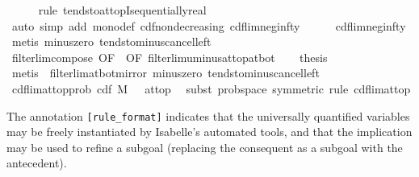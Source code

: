 \documentclass{article}
\theoremstyle{definition}
\begin{document}
\begin{isabellebody}
\ \ \ \ \isamarkupfalse%
\ {\isacharparenleft}rule\ tendsto{\isacharunderscore}at{\isacharunderscore}topI{\isacharunderscore}sequentially{\isacharunderscore}real{\isacharparenright}\isanewline
\ \ \ \ \isamarkupfalse%
\ {\isacharparenleft}auto\ simp\ add{\isacharcolon}\ mono{\isacharunderscore}def\ cdf{\isacharunderscore}nondecreasing\ cdf{\isacharunderscore}lim{\isacharunderscore}neg{\isacharunderscore}infty{\isacharparenright}\isanewline
\ \ \ \ \isamarkupfalse%
\ cdf{\isacharunderscore}lim{\isacharunderscore}neg{\isacharunderscore}infty\ \isamarkupfalse%
\ {\isacharparenleft}metis\ minus{\isacharunderscore}zero\ tendsto{\isacharunderscore}minus{\isacharunderscore}cancel{\isacharunderscore}left{\isacharparenright}\isanewline
\ \ \isamarkupfalse%
\ filterlim{\isacharunderscore}compose\ {\isacharbrackleft}OF\ {}{\isacharcomma}\ OF\ filterlim{\isacharunderscore}uminus{\isacharunderscore}at{\isacharunderscore}top{\isacharunderscore}at{\isacharunderscore}bot{\isacharbrackright}\isanewline
\ \ \isamarkupfalse%
\ {\isacharquery}thesis\isanewline
\ \ \ \ \isamarkupfalse%
\ {\isacharparenleft}metis\ {\isachardoublequoteopen}{}{\isachardoublequoteclose}\ filterlim{\isacharunderscore}at{\isacharunderscore}bot{\isacharunderscore}mirror\ minus{\isacharunderscore}zero\ tendsto{\isacharunderscore}minus{\isacharunderscore}cancel{\isacharunderscore}left{\isacharparenright}\isanewline
{}\isamarkupfalse%
\isanewline\isanewline%
\isamarkupfalse%
\ cdf{\isacharunderscore}lim{\isacharunderscore}at{\isacharunderscore}top{\isacharunderscore}prob{\isacharcolon}\ {\isachardoublequoteopen}{\isacharparenleft}cdf\ M\ {\isacharminus}{\isacharminus}{\isacharminus}{\isachargreater}\ {}{\isacharparenright}\ at{\isacharunderscore}top{\isachardoublequoteclose}\ \isanewline
{}\isamarkupfalse%
\ {\isacharparenleft}subst\ prob{\isacharunderscore}space\ {\isacharbrackleft}symmetric{\isacharbrackright}{\isacharcomma}\ rule\ cdf{\isacharunderscore}lim{\isacharunderscore}at{\isacharunderscore}top{\isacharparenright}%
\end{isabellebody}

\medskip

The annotation \texttt{[rule\_format]} indicates that the universally quantified variables may be freely instantiated by Isabelle's automated tools, and that the implication may be used to refine a subgoal (replacing the consequent as a subgoal with the antecedent). 
\end{document}
